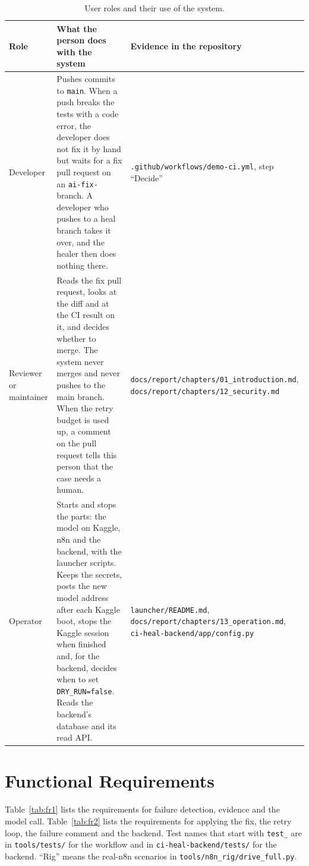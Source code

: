 \begin{table}[!htbp]
\centering
\small
\begin{tabularx}{\linewidth}{>{\raggedright\arraybackslash}p{2.8cm}>{\raggedright\arraybackslash}X>{\raggedright\arraybackslash}X}
\toprule
\textbf{Role} & \textbf{What the person does with the system} & \textbf{Evidence in the repository} \\
\midrule
Developer & Pushes commits to \texttt{main}. When a push breaks the tests with a code error, the developer does not fix it by hand but waits for a fix pull request on an \texttt{ai-fix-} branch. A developer who pushes to a heal branch takes it over, and the healer then does nothing there. & \texttt{.github/\allowbreak{}workflows/\allowbreak{}demo-ci.yml}, step ``Decide'' \\
Reviewer or maintainer & Reads the fix pull request, looks at the diff and at the CI result on it, and decides whether to merge. The system never merges and never pushes to the main branch. When the retry budget is used up, a comment on the pull request tells this person that the case needs a human. & \texttt{docs/\allowbreak{}report/\allowbreak{}chapters/\allowbreak{}01\_\allowbreak{}introduction.md}, \texttt{docs/\allowbreak{}report/\allowbreak{}chapters/\allowbreak{}12\_\allowbreak{}security.md} \\
Operator & Starts and stops the parts: the model on Kaggle, n8n and the backend, with the launcher scripts. Keeps the secrets, posts the new model address after each Kaggle boot, stops the Kaggle session when finished and, for the backend, decides when to set \texttt{DRY\_RUN=false}. Reads the backend's database and its read API. & \texttt{launcher/\allowbreak{}README.md}, \texttt{docs/\allowbreak{}report/\allowbreak{}chapters/\allowbreak{}13\_\allowbreak{}operation.md}, \texttt{ci-heal-backend/\allowbreak{}app/\allowbreak{}config.py} \\
\bottomrule
\end{tabularx}
\caption{User roles and their use of the system.}
\label{tab:roles}
\end{table}

\section{Functional Requirements}

Table~\ref{tab:fr1} lists the requirements for failure detection, evidence and the model call. Table~\ref{tab:fr2} lists the requirements for applying the fix, the retry loop, the failure comment and the backend. Test names that start with \texttt{test\_} are in \texttt{tools/\allowbreak{}tests/\allowbreak{}} for the workflow and in \texttt{ci-heal-backend/\allowbreak{}tests/\allowbreak{}} for the backend. ``Rig'' means the real-n8n scenarios in \texttt{tools/\allowbreak{}n8n\_\allowbreak{}rig/\allowbreak{}drive\_\allowbreak{}full.py}.

